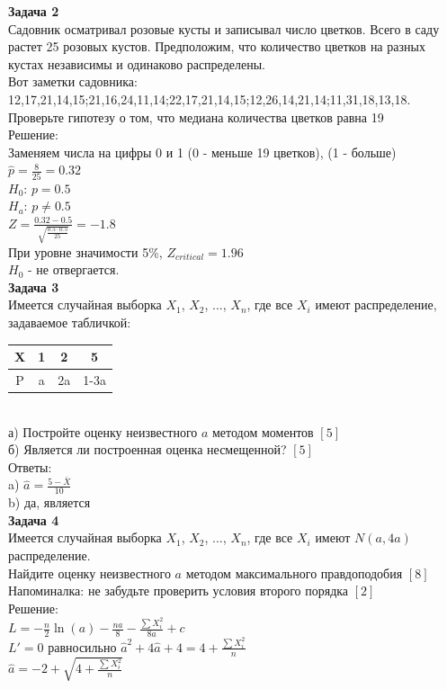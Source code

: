 \documentclass[12pt, a4paper]{article}\usepackage[]{graphicx}\usepackage[]{color}
\begin{document}
\textbf{Задача 2} \\ %
Садовник осматривал розовые кусты и записывал число цветков. Всего в саду растет 25 розовых кустов. Предположим, что количество цветков на разных кустах независимы и одинаково распределены. \\
Вот заметки садовника: \\
12,17,21,14,15;21,16,24,11,14;22,17,21,14,15;12,26,14,21,14;11,31,18,13,18.\\
Проверьте гипотезу о том, что медиана количества цветков равна 19\\
Решение: \\
Заменяем числа на цифры 0 и 1 (0 - меньше 19 цветков), (1 - больше) \\
$\hat{p}=\frac{8}{25}=0.32$ \\
$H_{0}$: $p=0.5$ \\
$H_{a}$: $p\neq 0.5$ \\
$Z=\frac{0.32-0.5}{\sqrt{\frac{0.5\cdot 0.5}{25}}}=-1.8$ \\
При уровне значимости 5\%, $Z_{critical}=1.96$ \\
$H_{0}$ - не отвергается. \\

\textbf{Задача 3} \\ %
Имеется случайная выборка $X_{1}$, $X_{2}$, ..., $X_{n}$, где все $X_{i}$ имеют распределение, задаваемое табличкой: \\
\begin{tabular}{|c|c|c|c|}
\hline
X & 1 & 2 & 5 \\
\hline
P & a & 2a & 1-3a \\
\hline
\end{tabular} \\
а) Постройте оценку неизвестного $a$ методом моментов $[5]$ \\
б) Является ли построенная оценка несмещенной? $[5]$ \\
Ответы: \\
a) $\hat{a}=\frac{5-\bar{X}}{10}$ \\
b) да, является \\


\textbf{Задача 4} \\ %
Имеется случайная выборка $X_{1}$, $X_{2}$, ..., $X_{n}$, где все $X_{i}$ имеют $N(a,4a)$ распределение. \\
Найдите оценку неизвестного $a$ методом максимального правдоподобия $[8]$  \\
Напоминалка: не забудьте проверить условия второго порядка $[2]$ \\
Решение: \\
$L=-\frac{n}{2}\ln(a)-\frac{na}{8}-\frac{\sum X_{i}^{2}}{8a}+c$ \\
$L'=0$ равносильно $\hat{a}^{2}+4\hat{a}+4=4+\frac{\sum X_{i}^{2}}{n}$ \\
$\hat{a}=-2+\sqrt{4+\frac{\sum X_{i}^{2}}{n}}$ \\
\end{document}
